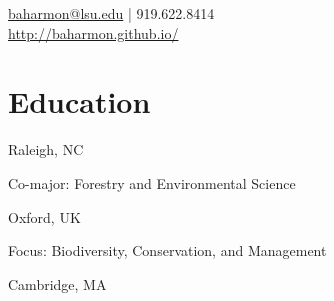\documentclass[]{baharmon_cv}
\begin{document}
%
%

%
%
{\vspace*{0.1cm} 
\href{mailto:baharmon@lsu.edu}{baharmon@lsu.edu} | 919.622.8414 \\
\url{http://baharmon.github.io/}\\
}
%
%


%
%


\vspace*{0.2cm}
\section{Education} 
\begin{minipage}[t]{0.85\textwidth} 
\end{minipage}
\begin{minipage}[t]{0.15\textwidth} 
Raleigh, NC
\end{minipage}
Co-major: Forestry and Environmental Science
\vspace*{0.1cm}

\begin{minipage}[t]{0.85\textwidth} 
\end{minipage}
\begin{minipage}[t]{0.15\textwidth} 
Oxford, UK
\end{minipage}
Focus: Biodiversity, Conservation, and Management
\vspace*{0.1cm}

\begin{minipage}[t]{0.85\textwidth} 
\end{minipage}
\begin{minipage}[t]{0.20\textwidth} 
Cambridge, MA
\end{minipage}
\vspace*{0.1cm}
\end{document}

